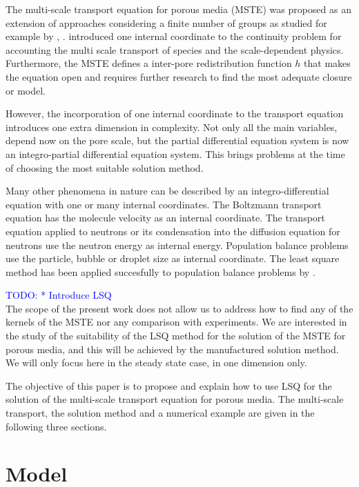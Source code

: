 \documentclass{CFD2011}
\newcommand{\TODO}[1]{\textcolor{blue}{TODO: #1} \\}
\begin{document}
The multi-scale transport equation for porous media (MSTE) was proposed as an extension of approaches considering a finite number of groups as studied for example by \cite{Chen1989}, \cite{bouffard2001}. \cite{DupuySchwarz} introduced one internal coordinate to the continuity problem for accounting the multi scale transport of species and the scale-dependent physics. Furthermore, the MSTE defines a inter-pore redistribution function $h$ that makes the equation open and requires further research to find the most adequate closure or model.

However, the incorporation of one internal coordinate to the transport equation introduces one extra dimension in complexity. Not only all the main variables, depend now on the pore scale, but the partial differential equation system is now an integro-partial differential equation system. This brings problems at the time of choosing the most suitable solution method. 

Many other phenomena in nature can be described by an integro-differential equation with one or many internal coordinates. The Boltzmann transport equation has the molecule velocity as an internal coordinate. The transport equation applied to neutrons or its condensation into the diffusion equation for neutrons use the neutron energy as internal energy. Population balance problems use the particle, bubble or droplet size as internal coordinate. The least square method has been applied succesfully to population balance problems by \cite{Dorao05a}.


\TODO{     * Introduce LSQ}


The scope of the present work does not allow us to address how to find any of the kernels of the MSTE nor any comparison with experiments. We are interested in the study of the suitability of the LSQ method for the solution of the MSTE for porous media, and this will be achieved by the manufactured solution method. We will only focus here in the steady state case, in one dimension only.

The objective of this paper is to propose and explain how to use LSQ for the solution of the multi-scale transport equation for porous media. The multi-scale transport, the solution method and a numerical example are given in the following three sections.

\section{Model}
\end{document}
